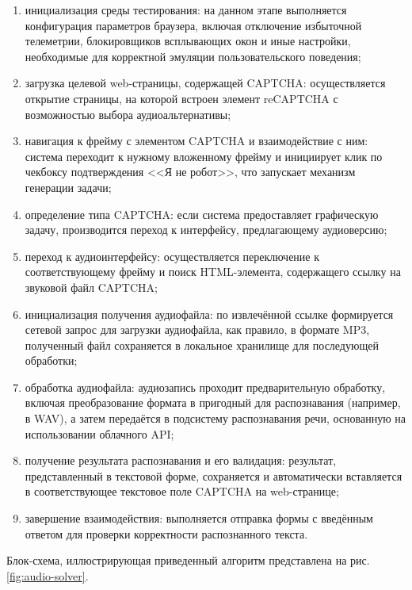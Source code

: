 \begin{enumerate}
    \item инициализация среды тестирования: на данном этапе выполняется 
    конфигурация параметров браузера, включая отключение избыточной телеметрии, 
    блокировщиков всплывающих окон и иные настройки, необходимые для корректной 
    эмуляции пользовательского поведения;
    \item загрузка целевой web-страницы, содержащей CAPTCHA: осуществляется 
    открытие страницы, на которой встроен элемент reCAPTCHA с возможностью выбора 
    аудиоальтернативы;
    \item навигация к фрейму с элементом CAPTCHA и взаимодействие с ним: система 
    переходит к нужному вложенному фрейму и инициирует клик по чекбоксу 
    подтверждения <<Я не робот>>, что запускает механизм генерации задачи;
    \item определение типа CAPTCHA: если система предоставляет графическую 
    задачу, производится переход к интерфейсу, предлагающему аудиоверсию;
    \item переход к аудиоинтерфейсу: осуществляется переключение к 
    соответствующему фрейму и поиск HTML-элемента, содержащего ссылку на звуковой 
    файл CAPTCHA;
    \item инициализация получения аудиофайла: по извлечённой ссылке формируется 
    сетевой запрос для загрузки аудиофайла, как правило, в формате MP3, 
    полученный файл сохраняется в локальное хранилище для последующей обработки;
    \item обработка аудиофайла: аудиозапись проходит предварительную обработку, 
    включая преобразование формата в пригодный для распознавания (например, в 
    WAV), а затем передаётся в подсистему распознавания речи, основанную на 
    использовании облачного API;
    \item получение результата распознавания и его валидация: результат, 
    представленный в текстовой форме, сохраняется и автоматически вставляется в 
    соответствующее текстовое поле CAPTCHA на web-странице;
    \item завершение взаимодействия: выполняется отправка формы с введённым 
    ответом для проверки корректности распознанного текста.
\end{enumerate}

Блок-схема, иллюстрирующая приведенный алгоритм представлена на рис.~
\ref{fig:audio-solver}.

